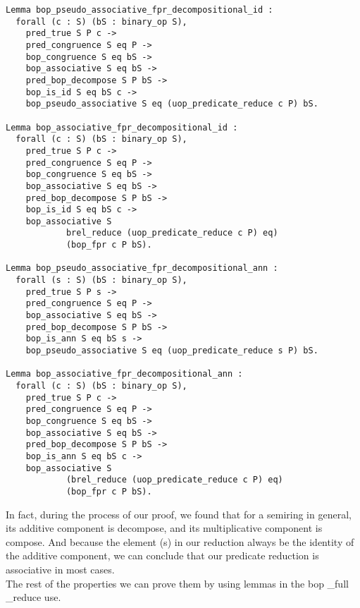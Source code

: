 \documentclass[a4paper,12pt,twoside,openright]{report}
\begin{document}
\begin{lstlisting}
Lemma bop_pseudo_associative_fpr_decompositional_id :
  forall (c : S) (bS : binary_op S),
    pred_true S P c ->
    pred_congruence S eq P ->
    bop_congruence S eq bS ->     
    bop_associative S eq bS -> 
    pred_bop_decompose S P bS ->
    bop_is_id S eq bS c -> 
    bop_pseudo_associative S eq (uop_predicate_reduce c P) bS. 
    
Lemma bop_associative_fpr_decompositional_id : 
  forall (c : S) (bS : binary_op S),
    pred_true S P c -> 
    pred_congruence S eq P -> 
    bop_congruence S eq bS ->     
    bop_associative S eq bS ->
    pred_bop_decompose S P bS ->
    bop_is_id S eq bS c -> 
    bop_associative S 
    		brel_reduce (uop_predicate_reduce c P) eq) 
    		(bop_fpr c P bS). 
    		
Lemma bop_pseudo_associative_fpr_decompositional_ann :
  forall (s : S) (bS : binary_op S),
    pred_true S P s -> 
    pred_congruence S eq P ->
    bop_associative S eq bS ->    
    pred_bop_decompose S P bS ->
    bop_is_ann S eq bS s ->     
    bop_pseudo_associative S eq (uop_predicate_reduce s P) bS.
    
Lemma bop_associative_fpr_decompositional_ann : 
  forall (c : S) (bS : binary_op S),
    pred_true S P c -> 
    pred_congruence S eq P -> 
    bop_congruence S eq bS ->     
    bop_associative S eq bS ->
    pred_bop_decompose S P bS ->
    bop_is_ann S eq bS c -> 
    bop_associative S 
    		(brel_reduce (uop_predicate_reduce c P) eq) 
    		(bop_fpr c P bS). 
\end{lstlisting}

In fact, during the process of our proof, we found that for a semiring in general, its additive component is decompose, and its multiplicative component is  compose. 
And because the element (s) in our reduction always be the identity of the additive component, we can conclude that our predicate reduction is associative in most cases.\\

The rest of the properties we can prove them by using lemmas in the bop \_full \_reduce use.
\end{document}
